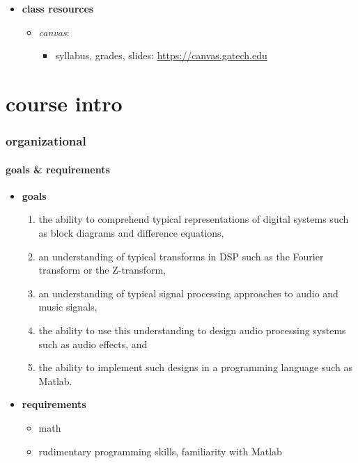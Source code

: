 \begin{frame}
\begin{itemize}
                \smallskip
                \item<3-> \textbf{class resources}
                    \begin{itemize}
                        \item	\textit{canvas}:
                            \begin{itemize}
                                \item   syllabus, grades, slides: \url{https://canvas.gatech.edu}
                            \end{itemize}
                    \end{itemize}
            \end{itemize}
        \end{frame}

    \section{course intro}
        \begin{frame}\frametitle{organizational}\framesubtitle{goals \& requirements}
            \begin{itemize}
                \item	\textbf{goals}
                        \begin{enumerate}
                            \item   the ability to comprehend typical representations of digital systems such as block diagrams and difference equations,
                            \item   an understanding of typical transforms in DSP such as the Fourier transform or the Z-transform,
                            \item   an understanding of typical signal processing approaches to audio and music signals,
                            \item   the ability to use this understanding to design audio processing systems such as audio effects, and
                            \item   the ability to implement such designs in a programming language such as Matlab.
                        \end{enumerate}

                \smallskip
                \item<2-> \textbf{requirements}	
                        \begin{itemize}
                            \item	math
                            \item	rudimentary programming skills, familiarity with Matlab
                        \end{itemize}
            \end{itemize}
        \end{frame}
